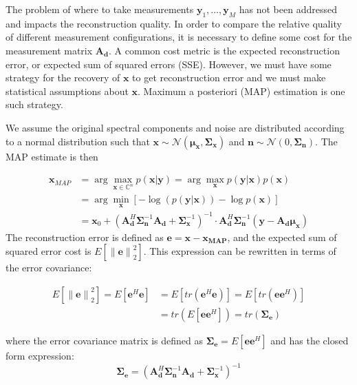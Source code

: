\documentclass{article}
\providecommand{\norm}[1]{\left\lVert#1\right\rVert}
\begin{document}
The problem of where to take measurements $\bm{y}_1, \dots, \bm{y}_M$ has not
been addressed and impacts the reconstruction quality.  In order to
compare the relative quality of different measurement configurations, it is
necessary to define some cost for the measurement matrix $\bm{A}_{\bm{d}}$.  A common cost
metric is the expected reconstruction error, or expected sum of squared errors
(SSE). However, we must have some strategy for the recovery of $\bm{x}$ to get
reconstruction error and we must make statistical assumptions about $\bm{x}$.
Maximum a posteriori (MAP) estimation is one such strategy.

We assume the original spectral components and noise are distributed according to a
normal distribution such that $\bm{x} \sim \mathcal{N}(\bm{\mu}_{\bm{x}}, \bm{\Sigma}_{\bm{x}})$ and
$\bm{n} \sim \mathcal{N}(0, \bm{\Sigma}_{\bm{n}})$.  The MAP estimate is then

$$
\begin{aligned}
  \bm{x}_{MAP} &= \arg \max_{\bm{x} \in \mathbb{C}^n} p(\bm{x} | \bm{y})
  = \arg \max_{\bm{x}} p(\bm{y}|\bm{x}) p(\bm{x})\\
  &= \arg \min_{\bm{x}} \left[  - \log(p(\bm{y}|\bm{x})) - \log
  p(\bm{x})\right] \\
  &= \bm{x}_0 + \left( \bm{A}_{\bm{d}}^H\bm{\Sigma}_{\bm{n}}^{-1} \bm{A}_{\bm{d}} +
    \bm{\Sigma}_{\bm{x}}^{-1}\right)^{-1}
  \cdot  \bm{A}_{\bm{d}}^H \bm{\Sigma}_{\bm{n}}^{-1} (\bm{y} - \bm{A}_{\bm{d}} \bm{\mu}_{\bm{x}})
\end{aligned}
$$
The reconstruction error is defined as $\bm{e} = \bm{x} - \bm{x_{\text{MAP}}}$,
and the expected sum of squared error cost is $E[\norm{\bm{e}}_2^2]$. This
expression can be rewritten in terms of the error covariance:

\begin{align*}
E[\norm{\bm{e}}_2^2] =  E[\bm{e}^H\bm{e}] & = E[tr(\bm{e}^H\bm{e})] = E[tr(\bm{e}\bm{e}^H)] \\
& = tr(E[\bm{e}\bm{e}^H]) = tr(\bm{\Sigma}_{\bm{e}})
\end{align*}

where the error covariance matrix is defined as $\bm{\Sigma}_{\bm{e}} =
E[\bm{e}\bm{e}^H]$ and has the closed form expression:
\begin{equation}
\bm{\Sigma}_{\bm{e}} = \left( \bm{A}_{\bm{d}}^H\bm{\Sigma}_{\bm{n}}^{-1} \bm{A}_{\bm{d}} +
    \bm{\Sigma}_{\bm{x}}^{-1}\right)^{-1}
\end{equation}
\end{document}
